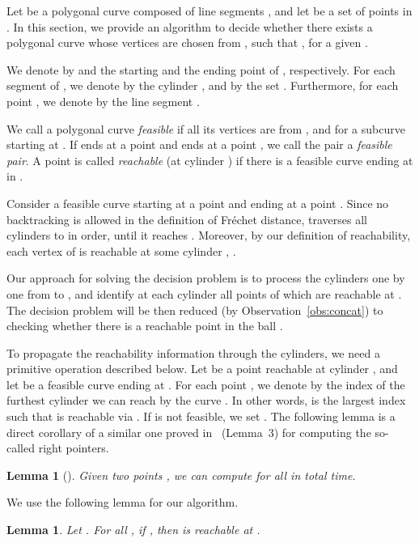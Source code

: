 \documentclass[12pt]{dalthesis}
\newtheorem{lemma}[theorem]{Lemma}
\newcommand{\Frechet}{Fr\'echet }
\begin{document}
Let  be a polygonal curve composed of  line segments ,
and let  be a set of  points in .
In this section, we provide an algorithm to
decide whether there exists a polygonal curve  whose vertices are chosen from ,
such that ,
for a given . 

We denote by  and  the starting and the ending point of , respectively.
For each segment  of ,
we denote by  the cylinder ,
and by  the set .
Furthermore, for each point ,
we denote by  the line segment .

We call a polygonal curve  \emph{feasible} if 
all its vertices are from , and
 for a subcurve  starting at .
If  ends at a point  and  ends at a point , 
we call the pair  a \emph{feasible pair}.
A point  is called \emph{reachable} (at cylinder )
if there is a feasible curve ending at  in .

Consider a feasible curve  starting at a point  and
ending at a point .
Since no backtracking is allowed in the definition of \Frechet distance,
 traverses all cylinders  to  in order, until it reaches .
Moreover, by our definition of reachability, 
each vertex of  is reachable at some cylinder , .

Our approach for solving the decision problem is to process the cylinders
one by one from  to , and identify at each cylinder 
all points of  which are reachable at .
The decision problem will be then reduced (by Observation~\ref{obs:concat}) 
to checking whether there is a reachable point in the ball .

To propagate the reachability information through the cylinders, 
we need a primitive operation described below.
Let  be a point reachable at cylinder , 
and let  be a feasible curve ending at .
For each point , 
we denote by  the index of the furthest cylinder 
we can reach by the curve .
In other words,
 is the largest index  such that 
 is reachable via .
If  is not feasible, we set .
The following lemma is a direct corollary of a similar one proved in~\cite{AltERW03a}  (Lemma~3)
for computing the so-called right pointers.


\begin{lemma}[\cite{AltERW03a}] \label{lemma:linear}
	Given two points ,
	we can compute  for all  in  total time.
\end{lemma}

We use the following lemma for our algorithm.

\begin{lemma} \label{lemma:cross}
	Let .
	For all ,  if , then  is reachable at .
\end{lemma}
\end{document}
